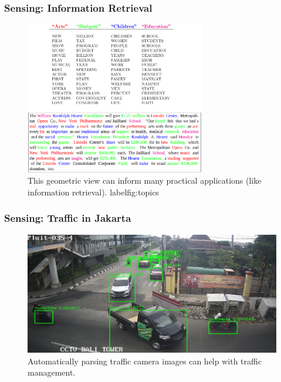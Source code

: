 \documentclass[10pt,mathserif]{beamer}
\begin{document}
\begin{frame}
  \frametitle{Sensing: Information Retrieval}
  \begin{figure}[ht]
    \centering
    \includegraphics[width=0.7\textwidth]{figures/topics}
    \caption{This geometric view can inform many practical applications (like
      information retrieval). label{fig:topics} }
  \end{figure}
\end{frame}

\begin{frame}
  \frametitle{Sensing: Traffic in Jakarta}
  \begin{figure}[ht]
    \centering
    \includegraphics[width=0.9\paperwidth]{figures/jakarta_traffic}
    \caption{Automatically parsing traffic camera images can help with traffic
      management. \citep{caldeira2018improving} \label{fig:jakarta} }
  \end{figure}
\end{frame}
\end{document}
